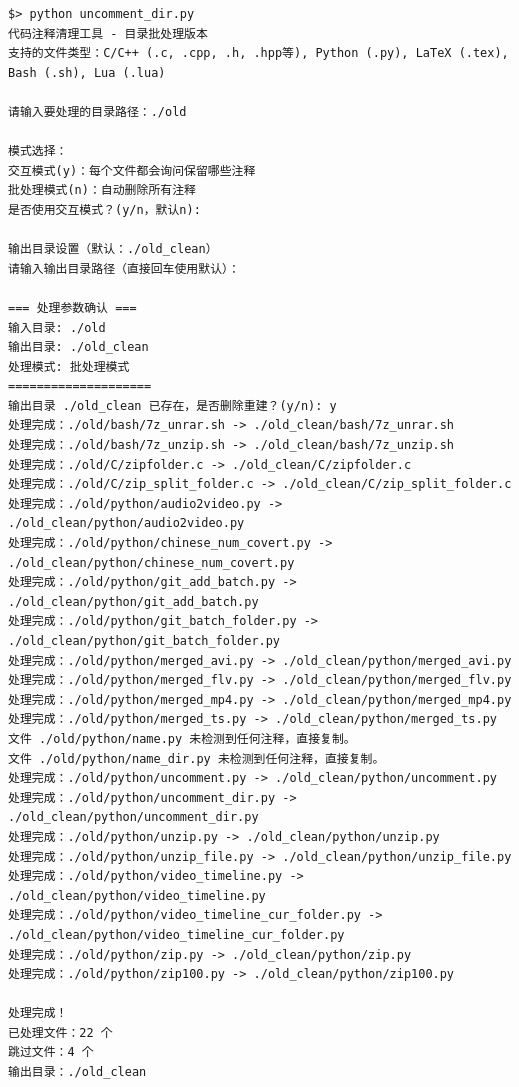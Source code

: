 \begin{lstlisting}[style=demostyle,numbers=none]
$> python uncomment_dir.py
代码注释清理工具 - 目录批处理版本
支持的文件类型：C/C++ (.c, .cpp, .h, .hpp等), Python (.py), LaTeX (.tex), Bash (.sh), Lua (.lua)

请输入要处理的目录路径：./old

模式选择：
交互模式(y)：每个文件都会询问保留哪些注释
批处理模式(n)：自动删除所有注释
是否使用交互模式？(y/n，默认n):

输出目录设置（默认：./old_clean）
请输入输出目录路径（直接回车使用默认）：

=== 处理参数确认 ===
输入目录: ./old
输出目录: ./old_clean
处理模式: 批处理模式
====================
输出目录 ./old_clean 已存在，是否删除重建？(y/n): y
处理完成：./old/bash/7z_unrar.sh -> ./old_clean/bash/7z_unrar.sh
处理完成：./old/bash/7z_unzip.sh -> ./old_clean/bash/7z_unzip.sh
处理完成：./old/C/zipfolder.c -> ./old_clean/C/zipfolder.c
处理完成：./old/C/zip_split_folder.c -> ./old_clean/C/zip_split_folder.c
处理完成：./old/python/audio2video.py -> ./old_clean/python/audio2video.py
处理完成：./old/python/chinese_num_covert.py -> ./old_clean/python/chinese_num_covert.py
处理完成：./old/python/git_add_batch.py -> ./old_clean/python/git_add_batch.py
处理完成：./old/python/git_batch_folder.py -> ./old_clean/python/git_batch_folder.py
处理完成：./old/python/merged_avi.py -> ./old_clean/python/merged_avi.py
处理完成：./old/python/merged_flv.py -> ./old_clean/python/merged_flv.py
处理完成：./old/python/merged_mp4.py -> ./old_clean/python/merged_mp4.py
处理完成：./old/python/merged_ts.py -> ./old_clean/python/merged_ts.py
文件 ./old/python/name.py 未检测到任何注释，直接复制。
文件 ./old/python/name_dir.py 未检测到任何注释，直接复制。
处理完成：./old/python/uncomment.py -> ./old_clean/python/uncomment.py
处理完成：./old/python/uncomment_dir.py -> ./old_clean/python/uncomment_dir.py
处理完成：./old/python/unzip.py -> ./old_clean/python/unzip.py
处理完成：./old/python/unzip_file.py -> ./old_clean/python/unzip_file.py
处理完成：./old/python/video_timeline.py -> ./old_clean/python/video_timeline.py
处理完成：./old/python/video_timeline_cur_folder.py -> ./old_clean/python/video_timeline_cur_folder.py
处理完成：./old/python/zip.py -> ./old_clean/python/zip.py
处理完成：./old/python/zip100.py -> ./old_clean/python/zip100.py

处理完成！
已处理文件：22 个
跳过文件：4 个
输出目录：./old_clean
\end{lstlisting}

